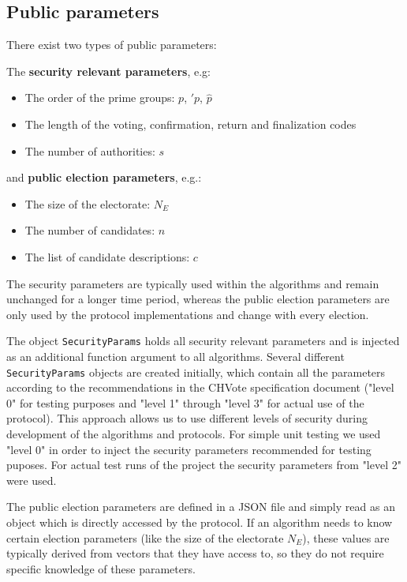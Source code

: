 \subsection{Public parameters}
There exist two types of public parameters:

The \textbf{security relevant parameters}, e.g:

\begin{itemize}
	\item The order of the prime groups: $p$, $\prime{p}$, $\hat{p}$
	\item The length of the voting, confirmation, return and finalization codes
	\item The number of authorities: $s$
\end{itemize}

and \textbf{public election parameters}, e.g.:

\begin{itemize}
	\item The size of the electorate: $N_E$
	\item The number of candidates: $n$
	\item The list of candidate descriptions: $c$
\end{itemize}

The security parameters are typically used within the algorithms and remain unchanged for a longer time period, whereas the public election parameters are only used by the protocol implementations and change with every election.

The object \texttt{SecurityParams} holds all security relevant parameters and is injected as an additional function argument to all algorithms. Several different \texttt{SecurityParams} objects are created initially, which contain all the parameters according to the recommendations in the CHVote specification document ("level 0" for testing purposes and "level 1" through "level 3" for actual use of the protocol). This approach allows us to use different levels of security during development of the algorithms and protocols. For simple unit testing we used "level 0" in order to inject the security parameters recommended for testing puposes. For actual test runs of the project the security parameters from "level 2" were used.

The public election parameters are defined in a JSON file and simply read as an object which is directly accessed by the protocol. If an algorithm needs to know certain election parameters (like the size of the electorate $N_E$), these values are typically derived from vectors that they have access to, so they do not require specific knowledge of these parameters.

